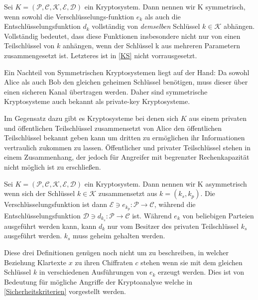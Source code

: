 \documentclass[12pt,a4paper]{scrartcl}	%
\begin{document}
\begin{theorem}
	 Sei $K = (\mathcal{P},\mathcal{C},\mathcal{K},\mathcal{E},\mathcal{D})$ ein Kryptosystem. Dann nennen wir K symmetrisch, wenn sowohl die Verschlüsselungs-funktion $e_k$ als auch die Entschlüsselungsfunktion $d_k$ vollständig von \textit{demselben} Schlüssel $k\in\mathcal{K}$ abhängen. Vollständig bedeutet, dass diese Funktionen insbesondere nicht nur von einen Teilschlüssel von $k$ anhängen, wenn der Schlüssel k aus mehreren Parametern zusammengesetzt ist. Letzteres ist in \ref{KS} nicht vorrausgesetzt.
\end{theorem}

Ein Nachteil von Symmetrischen Kryptosystemen liegt auf der Hand: Da sowohl Alice als auch Bob den gleichen geheimen Schlüssel benötigen, muss dieser über einen sicheren Kanal übertragen werden. Daher sind  symmetrische Kryptosysteme auch bekannt als private-key Kryptosysteme.

Im Gegensatz dazu gibt es Kryptosysteme bei denen sich $K$ aus einem privaten und öffentlichen Teilschlüssel zusammensetzt von Alice den öffentlichen Teilschlüssel bekannt geben kann um dritten zu ermöglichen ihr Informationen vertraulich zukommen zu lassen. Öffentlicher und privater Teilschlüssel stehen in einem Zusammenhang, der jedoch für Angreifer mit begrenzter Rechenkapazität nicht möglich ist zu erschließen.

\begin{theorem}
Sei $K = (\mathcal{P},\mathcal{C},\mathcal{K},\mathcal{E},\mathcal{D})$ ein Kryptosystem. Dann nennen wir K asymmetrisch wenn sich der Schlüssel $k\in\mathcal{K}$ zusammensetzt aus $k=(k_s, k_p)$. Die Verschlüsselungsfunktion ist dann $\mathcal{E}\ni e_{k_p}:\mathcal{P}\rightarrow\mathcal{C}$, während die Entschlüsselungsfunktion $\mathcal{D}\ni d_{k_s}:\mathcal{P}\rightarrow\mathcal{C}$ ist. Während $e_k$ von beliebigen Parteien ausgeführt werden kann, kann $d_k$ nur vom Besitzer des privaten Teilschlüssel $k_s$ ausgeführt werden. $k_s$ muss geheim gehalten werden.
\end{theorem}

Diese drei Definitionen genügen noch nicht um zu beschreiben, in welcher Beziehung Klartexte $x$ zu ihren Chiffraten $c$ stehen wenn sie mit dem gleichen Schlüssel $k$ in verschiedenen Ausführungen von $e_k$ erzeugt werden. Dies ist von Bedeutung für mögliche Angriffe der Kryptoanalyse welche in \ref{Sicherheitskriterien} vorgestellt werden.
\end{document}
